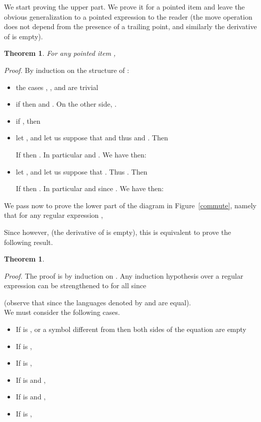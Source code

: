 \documentclass[preprint]{sigplanconf}
\newcounter{item}
\newtheorem{theorem}[item]{Theorem}
\newenvironment{proof}{\begin{trivlist}\item[]{\em Proof.}}{\end{trivlist}}
\begin{document}
We start proving the upper part. We prove it for a pointed item 
and leave the obvious generalization to a pointed expression to the reader
(the move operation does not depend from the presence of a trailing
point, and similarly the derivative of  is empty).

\begin{theorem}\label{techy}For any pointed item ,
  
\end{theorem}
\begin{proof}
By induction on the structure of :
\begin{itemize}
\item the cases , ,  and  are trivial
\item if  then 
and  . On the other side, 
.
\item if , then

\item let , and let us suppose that  and thus 
and . Then

If  then
. In particular
 and .
We have then:

\item let , and let us suppose that . Thus .
Then

If  then
.
In particular
 and  since
.
We have then:

\end{itemize}
\end{proof}




We pass now to prove the lower part of the diagram in Figure~\ref{commute},
namely that for any regular expression , 
 
Since however, 
 (the derivative of 
is empty), this is equivalent to prove the following
result.





\begin{theorem}\label{techw}

\end{theorem}
\begin{proof}
The proof is by induction on .
Any induction hypothesis over a regular
expression  can be strengthened to
 for all  since

(observe that  since the languages denoted by  and  are equal).\\
We must consider the following cases.
\begin{itemize}
\item If  is ,  or a symbol  different from
 then both sides of the equation are empty
\item If  is ,
 
\item If  is ,

\item If  is  and ,

\item If  is  and ,

\item If  is ,

\end{itemize}
\end{proof}
\end{document}

